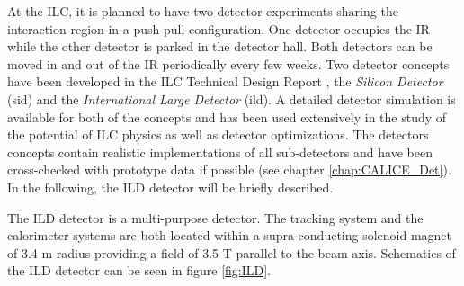 At the ILC, it is planned to have two detector experiments sharing the interaction region in a push-pull configuration. One detector occupies the IR while the other detector is parked in the detector hall. Both detectors can be moved in and out of the IR periodically every few weeks. Two detector concepts have been developed in the ILC Technical Design Report \cite{ILC_TDR_Vol4}, the \textit{Silicon Detector} (\acrshort{sid}) and the \textit{International Large Detector} (\acrshort{ild}). A detailed detector simulation is available for both of the concepts and has been used extensively in the study of the potential of ILC physics as well as detector optimizations. The detectors concepts contain realistic implementations of all sub-detectors and have been cross-checked with prototype data if possible (see chapter \ref{chap:CALICE_Det}). In the following, the ILD detector will be briefly described.

The ILD detector is a multi-purpose detector. The tracking system and the calorimeter systems are both located within a supra-conducting solenoid magnet of 3.4 m radius providing a field of 3.5 T parallel to the beam axis. Schematics of the ILD detector can be seen in figure \ref{fig:ILD}.


